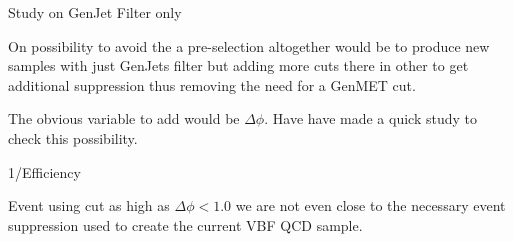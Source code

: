 \documentclass[8pt]{beamer}
\begin{document}
\begin{frame}{Study on GenJet Filter only}

On possibility to avoid the a pre-selection altogether would be to produce new samples with just GenJets filter
but adding more cuts there in other to get additional suppression thus removing the need for a GenMET cut.

The obvious variable to add would be $\Delta\phi$. Have have made a quick study to check this possibility.
 
\begin{block}{1/Efficiency}
 

\end{block}
 
Event using cut as high as $\Delta\phi<1.0$ we are not even close to the necessary event suppression used 
to create the current VBF QCD sample.
  
\end{frame}

%  
%  
% 
% 
%  
%  
% 
\end{document}
